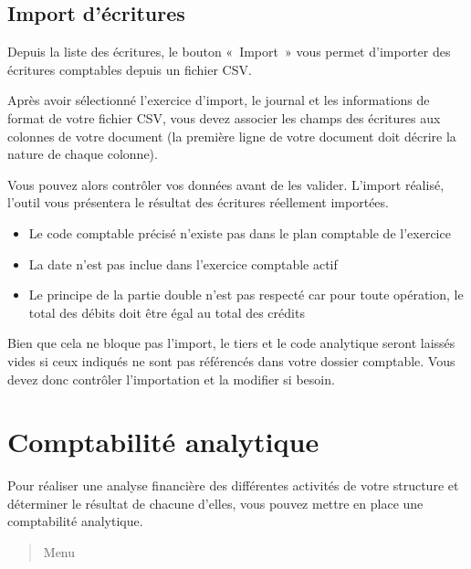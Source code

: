 \documentclass[a4paper,10pt,oneside,french]{sphinxmanual}
\begin{document}
\subsection{Import d’écritures}
\label{\detokenize{accounting/entity:import-d-ecritures}}
\sphinxAtStartPar
Depuis la liste des écritures, le bouton « Import » vous permet d’importer des écritures comptables depuis un fichier CSV.

\sphinxAtStartPar
Après avoir sélectionné l’exercice d’import, le journal et les informations de format de votre fichier CSV, vous devez associer les champs des écritures aux colonnes de votre document (la première ligne de votre document doit décrire la nature de chaque colonne).
\begin{quote}

\noindent{}
\end{quote}

\sphinxAtStartPar
Vous pouvez alors contrôler vos données avant de les valider.
L’import réalisé, l’outil vous présentera le résultat des écritures réellement importées.

\sphinxAtStartPar
{}
\begin{itemize}
\item {} 
\sphinxAtStartPar
Le code comptable précisé n’existe pas dans le plan comptable de l’exercice

\item {} 
\sphinxAtStartPar
La date n’est pas inclue dans l’exercice comptable actif

\item {} 
\sphinxAtStartPar
Le principe de la partie double n’est pas respecté car pour toute opération, le total des débits doit être égal au total des crédits

\end{itemize}

\sphinxAtStartPar
Bien que cela ne bloque pas l’import, le tiers et le code analytique seront laissés vides si ceux indiqués ne sont pas référencés dans votre dossier comptable. Vous devez donc contrôler l’importation et la modifier si besoin.


\section{Comptabilité analytique}
\label{\detokenize{accounting/costaccounting:comptabilite-analytique}}\label{\detokenize{accounting/costaccounting::doc}}
\sphinxAtStartPar
Pour réaliser une analyse financière des différentes activités de votre structure et déterminer le résultat de chacune d’elles, vous pouvez mettre en place une comptabilité analytique.
\begin{quote}

\sphinxAtStartPar
Menu 
\end{quote}
\end{document}

